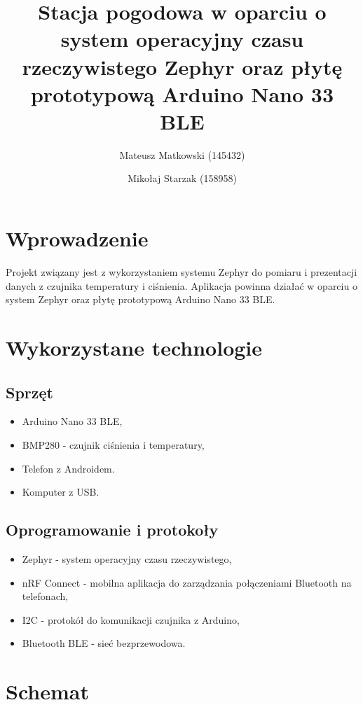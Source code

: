 \documentclass[11pt]{article} %
\title{Stacja pogodowa w oparciu o system operacyjny czasu rzeczywistego Zephyr oraz płytę prototypową Arduino Nano 33 BLE}
\author{%
   Mateusz Matkowski (145432) \and 
   Mikołaj Starzak (158958)}
\begin{document}
\maketitle

\section{Wprowadzenie}

Projekt związany jest z wykorzystaniem systemu Zephyr do pomiaru i prezentacji danych z czujnika temperatury i ciśnienia. Aplikacja powinna działać w oparciu o system Zephyr oraz płytę prototypową Arduino Nano 33 BLE.

\section{Wykorzystane technologie}

\subsection{Sprzęt}

\begin{itemize}
\item Arduino Nano 33 BLE,
\item BMP280 - czujnik ciśnienia i temperatury,
\item Telefon z Androidem.
\item Komputer z USB.
\end{itemize}

\subsection{Oprogramowanie i protokoły}

\begin{itemize}
\item Zephyr - system operacyjny czasu rzeczywistego,
\item nRF Connect - mobilna aplikacja do zarządzania połączeniami Bluetooth na telefonach,
\item I2C - protokół do komunikacji czujnika z Arduino,
\item Bluetooth BLE - sieć bezprzewodowa.
\end{itemize}

\section{Schemat}
\end{document}
